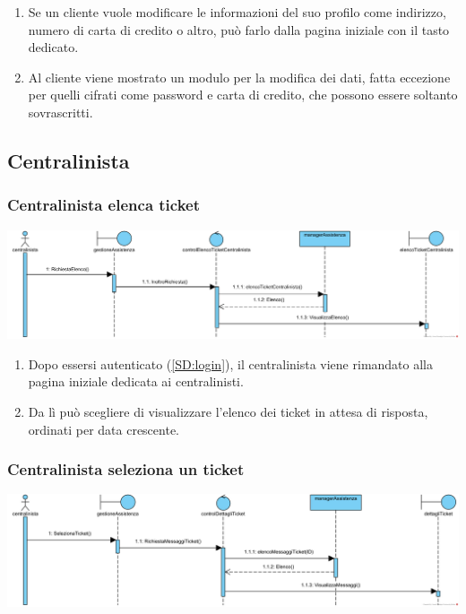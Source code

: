 \documentclass[12pt]{article}
\begin{document}
\begin{enumerate}
\item Se un cliente vuole modificare le informazioni del suo profilo come indirizzo, numero di carta di credito o altro, può farlo dalla pagina iniziale con il tasto dedicato.
\item Al cliente viene mostrato un modulo per la modifica dei dati, fatta eccezione per quelli cifrati come password e carta di credito, che possono essere soltanto sovrascritti.
\end{enumerate}

\newpage

\subsection{Centralinista}
\subsubsection{Centralinista elenca ticket}
\label{SD:centralinistaelencaticket}

\begin{center}
\includegraphics[width=\textwidth]{SequenceDiagram/CentralinistaTicketElenco}
\end{center}

\begin{enumerate}
\item Dopo essersi autenticato (\ref{SD:login}), il centralinista viene rimandato alla pagina iniziale dedicata ai centralinisti. 
\item Da lì può scegliere di visualizzare l'elenco dei ticket in attesa di risposta, ordinati per data crescente.
\end{enumerate}

\subsubsection{Centralinista seleziona un ticket}
\label{SD:selezioneticketcentralinista}

\begin{center}
\includegraphics[width=\textwidth]{SequenceDiagram/CentralinistaTicketSeleziona}
\end{center}
\end{document}
